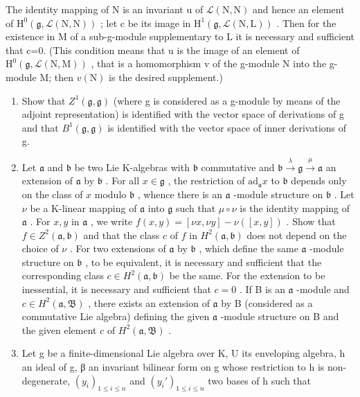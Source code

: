  The identity mapping of N is an invariant u of \(\mathcal{L}(\mathrm{N},\mathrm{N})\) and hence an element of \(\mathrm{H}^{0}(\mathfrak{g},\mathcal{L}(\mathrm{N},\mathrm{N}))\) ; let c be its image in \(\mathrm{H}^{1}(\mathfrak{g},\mathcal{L}(\mathrm{N},\mathrm{L}))\) . Then for the existence in M of a sub-g-module supplementary to L it is necessary and sufficient that c=0. (This condition means that u is the image of an element of \(\mathrm{H}^{0}(\mathfrak{g},\mathcal{L}(\mathrm{N},\mathrm{M}))\) , that is a homomorphism v of the g-module N into the g-module M; then \(v(\mathrm{N})\) is the desired supplement.)

\begin{enumerate}
\def\labelenumi{(\alph{enumi})}
\setcounter{enumi}{7}
\item
  Show that \(Z^{1}(\mathfrak{g},\mathfrak{g})\) (where g is considered as a g-module by means of the adjoint representation) is identified with the vector space of derivations of g and that \(B^{1}(\mathfrak{g},\mathfrak{g})\) is identified with the vector space of inner derivations of g.
\item
  Let \(\mathfrak{a}\) and \(\mathfrak{b}\) be two Lie K-algebras with \(\mathfrak{b}\) commutative and \(\mathfrak{b} \xrightarrow{\lambda} \mathfrak{g} \xrightarrow{\mu} \mathfrak{a}\) an extension of \(\mathfrak{a}\) by \(\mathfrak{b}\) . For all \(x \in \mathfrak{g}\) , the restriction of \(\mathrm{ad}_{\mathfrak{a}} x\) to \(\mathfrak{b}\) depends only on the class of \(x\) modulo \(\mathfrak{b}\) , whence there is an \(\mathfrak{a}\) -module structure on \(\mathfrak{b}\) . Let \(\nu\) be a K-linear mapping of \(\mathfrak{a}\) into \(\mathfrak{g}\) such that \(\mu \circ \nu\) is the identity mapping of \(\mathfrak{a}\) . For \(x, y\) in \(\mathfrak{a}\) , we write \(f(x, y) = [\nu x, \nu y] - \nu([x, y])\) . Show that \(f \in Z^2(\mathfrak{a}, \mathfrak{b})\) and that the class \(c\) of \(f\) in \(H^2(\mathfrak{a}, \mathfrak{b})\) does not depend on the choice of \(\nu\) . For two extensions of \(\mathfrak{a}\) by \(\mathfrak{b}\) , which define the same \(\mathfrak{a}\) -module structure on \(\mathfrak{b}\) , to be equivalent, it is necessary and sufficient that the corresponding class \(c \in H^2(\mathfrak{a}, \mathfrak{b})\) be the same. For the extension to be inessential, it is necessary and sufficient that \(c = 0\) . If B is an \(\mathfrak{a}\) -module and \(c \in H^2(\mathfrak{a}, \mathfrak{B})\) , there exists an extension of \(\mathfrak{a}\) by B (considered as a commutative Lie algebra) defining the given \(\mathfrak{a}\) -module structure on B and the given element \(c\) of \(H^2(\mathfrak{a}, \mathfrak{B})\) .
\item
  Let g be a finite-dimensional Lie algebra over K, U its enveloping algebra, h an ideal of g, β an invariant bilinear form on g whose restriction to h is non-degenerate, \((y_{i})_{1 \leqslant i \leqslant n}\) and \((y_{i}')_{1 \leqslant i \leqslant n}\) two bases of h such that
\end{enumerate}

